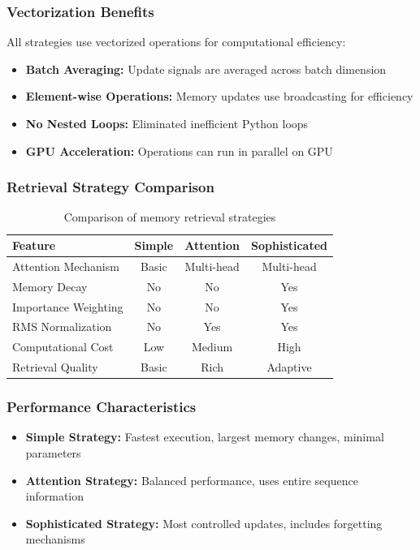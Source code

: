 \documentclass{article}
\begin{document}
\subsubsection{Vectorization Benefits}

All strategies use vectorized operations for computational efficiency:
\begin{itemize}
\item \textbf{Batch Averaging:} Update signals are averaged across batch dimension
\item \textbf{Element-wise Operations:} Memory updates use broadcasting for efficiency
\item \textbf{No Nested Loops:} Eliminated inefficient Python loops
\item \textbf{GPU Acceleration:} Operations can run in parallel on GPU
\end{itemize}

\subsubsection{Retrieval Strategy Comparison}

\begin{table}[h]
\centering
\begin{tabular}{|l|c|c|c|}
\hline
\textbf{Feature} & \textbf{Simple} & \textbf{Attention} & \textbf{Sophisticated} \\
\hline
Attention Mechanism & Basic & Multi-head & Multi-head \\
Memory Decay & No & No & Yes \\
Importance Weighting & No & No & Yes \\
RMS Normalization & No & Yes & Yes \\
Computational Cost & Low & Medium & High \\
Retrieval Quality & Basic & Rich & Adaptive \\
\hline
\end{tabular}
\caption{Comparison of memory retrieval strategies}
\end{table}

\subsubsection{Performance Characteristics}

\begin{itemize}
\item \textbf{Simple Strategy:} Fastest execution, largest memory changes, minimal parameters
\item \textbf{Attention Strategy:} Balanced performance, uses entire sequence information
\item \textbf{Sophisticated Strategy:} Most controlled updates, includes forgetting mechanisms
\end{itemize}
\end{document}
